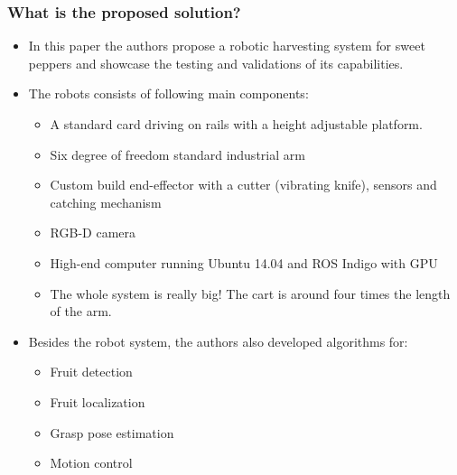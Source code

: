     \subsubsection*{What is the proposed solution?}
    \begin{itemize}
        \item In this paper the authors propose a robotic harvesting system for sweet peppers and showcase the testing and validations of its capabilities.
        \item The robots consists of following main components: \begin{itemize}
            \item A standard card driving on rails with a height adjustable platform. 
            \item Six degree of freedom standard industrial arm
            \item Custom build end-effector with a cutter (vibrating knife), sensors and catching mechanism
            \item RGB-D camera 
            \item High-end computer running Ubuntu 14.04 and ROS Indigo with GPU
            \item The whole system is really big! The cart is around four times the length of the arm.
        \end{itemize}
        \item Besides the robot system, the authors also developed algorithms for: \begin{itemize}
            \item Fruit detection
            \item Fruit localization
            \item Grasp pose estimation
            \item Motion control
        \end{itemize}
    \end{itemize}
